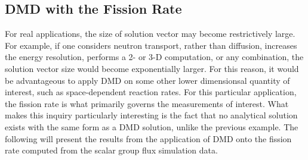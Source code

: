\documentclass{style/nseJournal}
\providecommand{\DIFadd}[1]{{\protect\color{blue}\uwave{#1}}} %
\providecommand{\DIFaddbegin}{} %
\providecommand{\DIFaddend}{} %
\begin{document}
\subsection{DMD with the Fission Rate}
For real applications, the size of \DIFaddbegin \DIFadd{the }\DIFaddend solution vector may become restrictively 
large.  
For example, if one considers neutron transport, rather than diffusion, increases the energy resolution,  performs a 2- or 3-D computation, or any combination, the solution vector size would become exponentially larger.  
For this reason, it would be  advantageous to apply DMD on some other lower dimensionsal quantity of interest, such as space-dependent reaction rates.  
For this particular application, the fission rate is what primarily governs the measurements of interest.  
What makes this inquiry particularly interesting is the fact that no analytical solution exists with the same form as a DMD solution, unlike the previous example.  
The following will present the results from the application of DMD onto the fission rate computed from the scalar group flux simulation data.  
\end{document}
